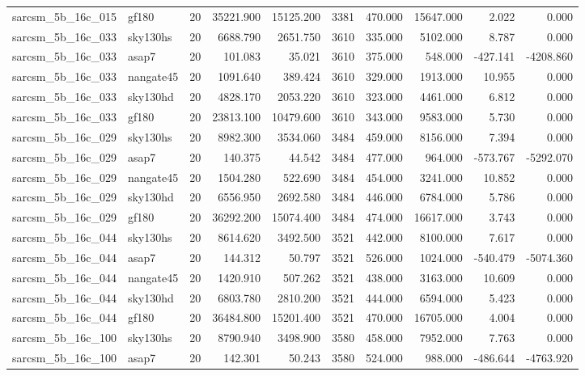 \begin{tabular}{llrrrrrrrr}
sarcsm\_5b\_16c\_015 & gf180 & 20 & 35221.900 & 15125.200 & 3381 & 470.000 & 15647.000 & 2.022 & 0.000 \\
sarcsm\_5b\_16c\_033 & sky130hs & 20 & 6688.790 & 2651.750 & 3610 & 335.000 & 5102.000 & 8.787 & 0.000 \\
sarcsm\_5b\_16c\_033 & asap7 & 20 & 101.083 & 35.021 & 3610 & 375.000 & 548.000 & -427.141 & -4208.860 \\
sarcsm\_5b\_16c\_033 & nangate45 & 20 & 1091.640 & 389.424 & 3610 & 329.000 & 1913.000 & 10.955 & 0.000 \\
sarcsm\_5b\_16c\_033 & sky130hd & 20 & 4828.170 & 2053.220 & 3610 & 323.000 & 4461.000 & 6.812 & 0.000 \\
sarcsm\_5b\_16c\_033 & gf180 & 20 & 23813.100 & 10479.600 & 3610 & 343.000 & 9583.000 & 5.730 & 0.000 \\
sarcsm\_5b\_16c\_029 & sky130hs & 20 & 8982.300 & 3534.060 & 3484 & 459.000 & 8156.000 & 7.394 & 0.000 \\
sarcsm\_5b\_16c\_029 & asap7 & 20 & 140.375 & 44.542 & 3484 & 477.000 & 964.000 & -573.767 & -5292.070 \\
sarcsm\_5b\_16c\_029 & nangate45 & 20 & 1504.280 & 522.690 & 3484 & 454.000 & 3241.000 & 10.852 & 0.000 \\
sarcsm\_5b\_16c\_029 & sky130hd & 20 & 6556.950 & 2692.580 & 3484 & 446.000 & 6784.000 & 5.786 & 0.000 \\
sarcsm\_5b\_16c\_029 & gf180 & 20 & 36292.200 & 15074.400 & 3484 & 474.000 & 16617.000 & 3.743 & 0.000 \\
sarcsm\_5b\_16c\_044 & sky130hs & 20 & 8614.620 & 3492.500 & 3521 & 442.000 & 8100.000 & 7.617 & 0.000 \\
sarcsm\_5b\_16c\_044 & asap7 & 20 & 144.312 & 50.797 & 3521 & 526.000 & 1024.000 & -540.479 & -5074.360 \\
sarcsm\_5b\_16c\_044 & nangate45 & 20 & 1420.910 & 507.262 & 3521 & 438.000 & 3163.000 & 10.609 & 0.000 \\
sarcsm\_5b\_16c\_044 & sky130hd & 20 & 6803.780 & 2810.200 & 3521 & 444.000 & 6594.000 & 5.423 & 0.000 \\
sarcsm\_5b\_16c\_044 & gf180 & 20 & 36484.800 & 15201.400 & 3521 & 470.000 & 16705.000 & 4.004 & 0.000 \\
sarcsm\_5b\_16c\_100 & sky130hs & 20 & 8790.940 & 3498.900 & 3580 & 458.000 & 7952.000 & 7.763 & 0.000 \\
sarcsm\_5b\_16c\_100 & asap7 & 20 & 142.301 & 50.243 & 3580 & 524.000 & 988.000 & -486.644 & -4763.920 \\

\end{tabular}
